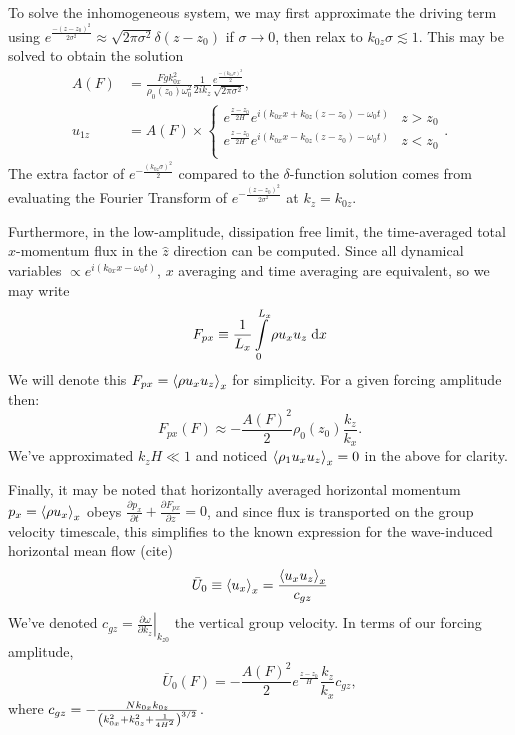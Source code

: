 \documentclass[twocolumn,
        usenames, %
        dvipsnames %
    ]{revtex4-1}%
\newcommand*{\pd}[2]{\frac{\partial#1}{\partial#2}}
\newcommand*{\at}[1]{\left.#1\right|}
\DeclarePairedDelimiter\ev{\langle}{\rangle}
\DeclarePairedDelimiter\p{\lparen}{\rparen}
\begin{document}
To solve the inhomogeneous system, we may first approximate the driving term
using $e^{\frac{-(z - z_0)^2}{2\sigma^2}} \approx \sqrt{2\pi \sigma^2}\delta(z -
z_0)$ if $\sigma \to 0$, then relax to $k_{0z}\sigma \lesssim 1$. This may be
solved to obtain the solution
\begin{align}
    A(F) &= \frac{Fgk_{0x}^2}{\rho_0(z_0)\omega_0^2}
        \frac{1}{2ik_z}\frac{e^{\frac{-(k_{0z}\sigma)^2}{2}}}
        {\sqrt{2\pi\sigma^2}},\\
    u_{1z} &= A(F) \times\begin{cases}
        e^{\frac{z - z_0}{2H}}e^{i(k_{0x}x + k_{0z}(z - z_0) - \omega_0 t)}
            & z > z_0\\
        e^{\frac{z - z_0}{2H}}e^{i(k_{0x}x - k_{0z}(z - z_0) - \omega_0 t)}
            & z < z_0\\
    \end{cases}.\label{eq:uz_lin}
\end{align}
The extra factor of $e^{-\frac{(k_{0z}\sigma)^2}{2}}$ compared to the
$\delta$-function solution comes from evaluating the Fourier Transform of
$e^{-\frac{(z - z_0)^2}{2\sigma^2}}$ at $k_z = k_{0z}$.

Furthermore, in the low-amplitude, dissipation free limit, the time-averaged
total $x$-momentum flux in the $\hat{z}$ direction can be computed. Since all
dynamical variables $\propto e^{i(k_{0x}x - \omega_0 t)}$, $x$ averaging and
time averaging are equivalent, so we may write
\begin{equation}
    F_{px} \equiv \frac{1}{L_x}\int_0^{L_x}\limits \rho u_x u_z\;\mathrm{d}x
\end{equation}
We will denote this $F_{px} = \ev*{\rho u_xu_z}_x$ for simplicity. For a given
forcing amplitude then:
\begin{equation}
    F_{px}(F) \approx -\frac{A(F)^2}{2}\rho_0(z_0) \frac{k_z}{k_x}.
        \label{eq:fpx_lin}
\end{equation}
We've approximated $k_zH \ll 1$ and noticed $\ev*{\rho_1 u_xu_z}_x = 0$ in the
above for clarity.

Finally, it may be noted that horizontally averaged horizontal momentum
$p_x = \ev*{\rho u_x}_x$ obeys $\pd{p_x}{t} + \pd{F_{px}}{z} = 0$, and since
flux is transported on the group velocity timescale, this simplifies to the
known expression for the wave-induced horizontal mean flow (cite)
\begin{equation}
    \bar{U}_0 \equiv \ev*{u_x}_x = \frac{\ev*{u_xu_z}_x}{c_{gz}}
\end{equation}
We've denoted $c_{gz} = \at{\pd{\omega}{k_{z}}}_{k_{z0}}$ the vertical group
velocity. In terms of our forcing amplitude,
\begin{equation}
    \bar{U}_0(F) = -\frac{A(F)^2}{2}e^{\frac{z - z_0}{H}} \frac{k_z}{k_x}c_{gz},
        \label{eq:u0_lin}
\end{equation}
where $c_{gz} = -\frac{Nk_{0x}k_{0z}}{\p*{k_{0x}^2 + k_{0z}^2 +
\frac{1}{4H^2}}^{3/2}}$.
\end{document}

